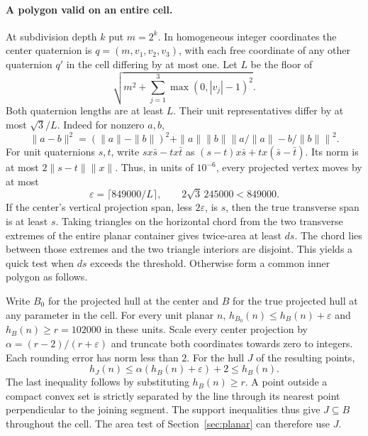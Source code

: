 \paragraph{A polygon valid on an entire cell.}
At subdivision depth $k$ put $m=2^k$. In homogeneous integer coordinates
the center quaternion is $q=(m,v_1,v_2,v_3)$, with each free coordinate
of any other quaternion $q'$ in the cell differing by at most one.
Let $L$ be the floor of
\[
 \sqrt{m^2+\sum_{j=1}^3 \max(0,|v_j|-1)^2}.
\]
Both quaternion lengths are at least $L$. Their unit representatives
differ by at most $\sqrt3/L$. Indeed for nonzero $a,b$,
\[
 \|a-b\|^2=(\|a\|-\|b\|)^2+
  \|a\|\|b\|\left\|a/\|a\|-b/\|b\|\right\|^2 .
\]
For unit quaternions $s,t$, write $s x\bar s-t x\bar t$ as
$(s-t)x\bar s+t x(\bar s-\bar t)$. Its norm is at most
$2\|s-t\|\|x\|$. Thus, in units of $10^{-6}$, every projected vertex
moves by at most
\[
 \varepsilon=\lceil849000/L\rceil,
 \qquad 2\sqrt3\,245000<849000.
\]
If the center's vertical projection span, less $2\varepsilon$, is $s$,
then the true transverse span is at least $s$. Taking triangles on the
horizontal chord from the two transverse extremes of the entire planar
container gives twice-area at least $ds$. The chord lies between those
extremes and the two triangle interiors are disjoint. This yields a
quick test when $ds$ exceeds the threshold. Otherwise form a common
inner polygon as follows.

Write $B_0$ for the projected hull at the center and $B$ for the true
projected hull at any parameter in the cell. For every unit planar $n$,
$h_{B_0}(n)\le h_B(n)+\varepsilon$ and $h_B(n)\ge r=102000$ in
these units. Scale every center projection by
$\alpha=(r-2)/(r+\varepsilon)$ and truncate both coordinates towards
zero to integers. Each rounding error has norm less than $2$. For the
hull $J$ of the resulting points,
\[
 h_J(n)\le \alpha(h_B(n)+\varepsilon)+2\le h_B(n).
\]
The last inequality follows by substituting $h_B(n)\ge r$. A point outside a compact convex set is strictly separated by the line through its nearest point perpendicular to the joining segment. The support inequalities thus give $J\subseteq B$ throughout the cell.
The area test of Section~\ref{sec:planar} can therefore use $J$.

